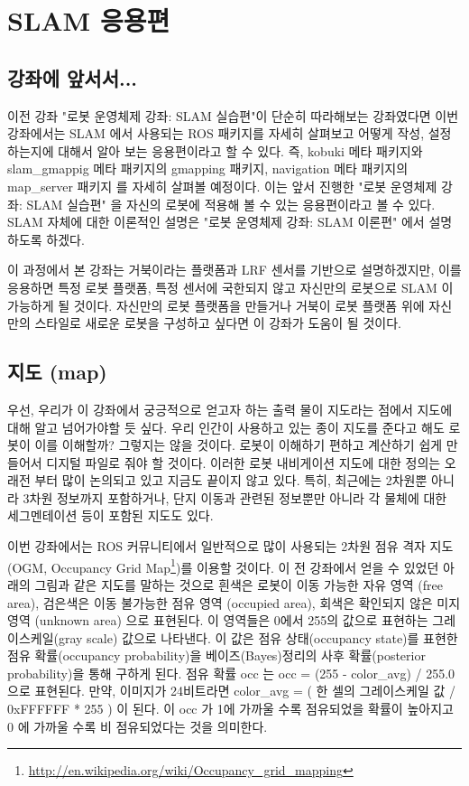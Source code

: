 \section{SLAM 응용편}

\subsection{강좌에 앞서서...}

이전 강좌 "로봇 운영체제 강좌: SLAM 실습편"이 단순히 따라해보는 강좌였다면 이번 강좌에서는 SLAM 에서 사용되는 ROS 패키지를 자세히 살펴보고 어떻게 작성, 설정하는지에 대해서 알아 보는 응용편이라고 할 수 있다. 즉, kobuki 메타 패키지와 slam\_gmappig 메타 패키지의 gmapping 패키지, navigation 메타 패키지의 map\_server 패키지 를 자세히 살펴볼 예정이다. 이는 앞서 진행한 "로봇 운영체제 강좌: SLAM 실습편" 을 자신의 로봇에 적용해 볼 수 있는 응용편이라고 볼 수 있다. SLAM 자체에 대한 이론적인 설명은 "로봇 운영체제 강좌: SLAM 이론편" 에서 설명하도록 하겠다.

이 과정에서 본 강좌는 거북이라는 플랫폼과 LRF 센서를 기반으로 설명하겠지만, 이를 응용하면 특정 로봇 플랫폼, 특정 센서에 국한되지 않고 자신만의 로봇으로 SLAM 이 가능하게 될 것이다. 자신만의 로봇 플랫폼을 만들거나 거북이 로봇 플랫폼 위에 자신만의 스타일로 새로운 로봇을 구성하고 싶다면 이 강좌가 도움이 될 것이다.

\subsection{지도 (map)}

우선, 우리가 이 강좌에서 궁긍적으로 얻고자 하는 출력 물이 지도라는 점에서 지도에 대해 알고 넘어가야할 듯 싶다. 우리 인간이 사용하고 있는 종이 지도를 준다고 해도 로봇이 이를 이해할까? 그렇지는 않을 것이다. 로봇이 이해하기 편하고 계산하기 쉽게 만들어서 디지털 파일로 줘야 할 것이다. 이러한 로봇 내비게이션 지도에 대한 정의는 오래전 부터 많이 논의되고 있고 지금도 끝이지 않고 있다. 특히, 최근에는 2차원뿐 아니라 3차원 정보까지 포함하거나, 단지 이동과 관련된 정보뿐만 아니라 각 물체에 대한 세그멘테이션 등이 포함된 지도도 있다.

이번 강좌에서는 ROS 커뮤니티에서 일반적으로 많이 사용되는 2차원 점유 격자 지도(OGM, Occupancy Grid Map\footnote{\url{http://en.wikipedia.org/wiki/Occupancy_grid_mapping}})를 이용할 것이다. 이 전 강좌에서 얻을 수 있었던 아래의 그림과 같은 지도를 말하는 것으로 흰색은 로봇이 이동 가능한 자유 영역 (free area), 검은색은 이동 불가능한 점유 영역 (occupied area), 회색은 확인되지 않은 미지 영역 (unknown area) 으로 표현된다. 이 영역들은 0에서 255의 값으로 표현하는 그레이스케일(gray scale) 값으로 나타낸다. 이 값은 점유 상태(occupancy state)를 표현한 점유 확률(occupancy probability)을 베이즈(Bayes)정리의 사후 확률(posterior probability)을 통해 구하게 된다. 점유 확률 occ 는 occ = (255 - color\_avg) / 255.0 으로 표현된다. 만약, 이미지가 24비트라면 color\_avg = ( 한 셀의 그레이스케일 값 / 0xFFFFFF * 255 ) 이 된다. 이 occ 가 1에 가까울 수록 점유되었을 확률이 높아지고 0 에 가까울 수록 비 점유되었다는 것을 의미한다.

